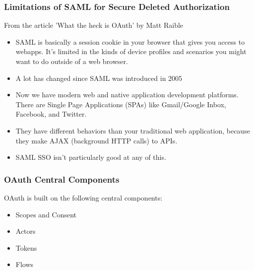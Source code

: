 \documentclass{beamer}
\begin{document}
	\begin{frame}
		\frametitle{Limitations of SAML for Secure Deleted Authorization}
		From the article 'What the heck is OAuth' by Matt Raible
		\begin{itemize}
			\setlength{\itemsep}{5pt}
			\item SAML is basically a session cookie in your browser that gives you access to webapps. It’s limited in the kinds of device profiles and scenarios you might want to do outside of a web browser.
			\item A lot has changed since SAML was introduced in 2005
			\item Now we have modern web and native application development platforms. There are Single Page Applications (SPAs) like Gmail/Google Inbox, Facebook, and Twitter.
			\item They have different behaviors than your traditional web application, because they make AJAX (background HTTP calls) to APIs.
			\item SAML SSO isn’t particularly good at any of this.
		\end{itemize}
	\end{frame}

	\begin{frame}
		\frametitle{OAuth Central Components}
		OAuth is built on the following central components:
		\vspace{10pt}
		\begin{itemize}
			\setlength{\itemsep}{10pt}
			\item Scopes and Consent
			\item Actors
			\item Tokens
			\item Flows
		\end{itemize}
	\end{frame}
	
\end{document}
